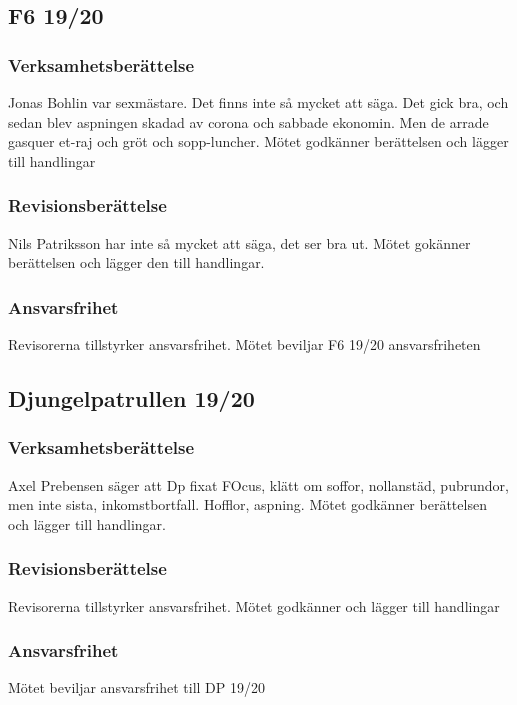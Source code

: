 \documentclass{sektionsmote}
\begin{document}
\subsection{F6 19/20}

\subsubsection{Verksamhetsberättelse}

Jonas Bohlin var sexmästare.
Det finns inte så mycket att säga. Det gick bra, och sedan blev aspningen skadad av corona och sabbade ekonomin.
Men de arrade gasquer et-raj och gröt och sopp-luncher.
Mötet godkänner berättelsen och lägger till handlingar

\subsubsection{Revisionsberättelse}
Nils Patriksson har inte så mycket att säga, det ser bra ut.
Mötet gokänner berättelsen och lägger den till handlingar.

\subsubsection{Ansvarsfrihet}
Revisorerna tillstyrker ansvarsfrihet.
Mötet beviljar F6 19/20 ansvarsfriheten

\subsection{Djungelpatrullen 19/20}

\subsubsection{Verksamhetsberättelse}
Axel Prebensen säger att Dp fixat FOcus, klätt om soffor, nollanstäd, pubrundor, men inte sista, inkomstbortfall.
Hofflor, aspning.
Mötet godkänner berättelsen och lägger till handlingar.

\subsubsection{Revisionsberättelse}
Revisorerna tillstyrker ansvarsfrihet.
Mötet godkänner och lägger till handlingar

\subsubsection{Ansvarsfrihet}
Mötet beviljar ansvarsfrihet till DP 19/20
\end{document}
